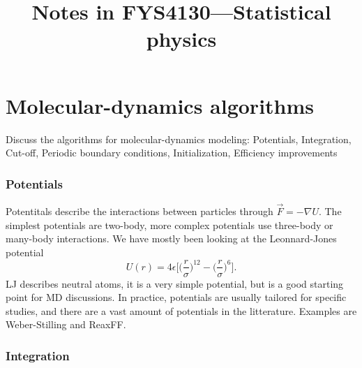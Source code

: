 \documentclass[a4paper, 11pt, notitlepage, english]{article}
\author{}
\title{Notes in FYS4130---Statistical physics}
\renewcommand{\b}{\bigg}
\newcommand{\eps}{\epsilon}
\begin{document}


\section{Molecular-dynamics algorithms}
Discuss the algorithms for molecular-dynamics modeling: Potentials, Integration, Cut-off, Periodic boundary conditions, Initialization, Efficiency improvements
	
\subsubsection*{Potentials}

Potentitals describe the interactions between particles through $\vec{F} = -\nabla U$. The simplest potentials are two-body, more complex potentials use three-body or many-body interactions. We have mostly been looking at the Leonnard-Jones potential 
$$U(r) = 4\eps \bigg[\b(\frac{r}{\sigma}\b)^{12} - \b(\frac{r}{\sigma}\b)^6\bigg].$$
LJ describes neutral atoms, it is a very simple potential, but is a good starting point for MD discussions. In practice, potentials are usually tailored for specific studies, and there are a vast amount of potentials in the litterature. Examples are Weber-Stilling and ReaxFF.

\subsubsection*{Integration}
\end{document}
